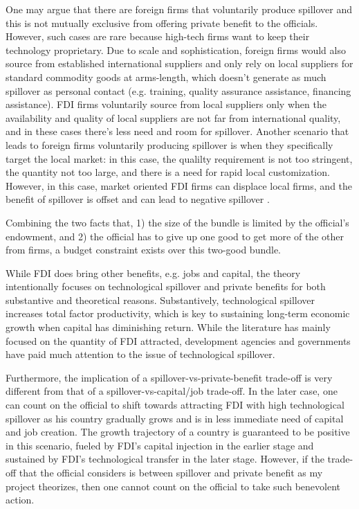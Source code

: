 One may argue that there are foreign firms that voluntarily produce spillover and this is not mutually exclusive from offering private benefit to the officials. However, such cases are rare because high-tech firms want to keep their technology proprietary. Due to scale and sophistication, foreign firms would also source from established international suppliers and only rely on local suppliers for standard commodity goods at arms-length, which doesn't generate as much spillover as personal contact (e.g. training, quality assurance assistance, financing assistance). FDI firms voluntarily source from local suppliers only when the availability and quality of local suppliers are not far from international quality, and in these cases there's less need and room for spillover. Another scenario that leads to foreign firms voluntarily producing spillover is when they specifically target the local market: in this case, the qualilty requirement is not too stringent, the quantity not too large, and there is a need for rapid local customization. However, in this case, market oriented FDI firms can displace local firms, and the benefit of spillover is offset and can lead to negative spillover \citep{Mody2004}.

Combining the two facts that, 1) the size of the bundle is limited by the official's endowment, and 2) the official has to give up one good to get more of the other from firms, a budget constraint exists over this two-good bundle.

While FDI does bring other benefits, e.g. jobs and capital, the theory intentionally focuses on technological spillover and private benefits for both substantive and theoretical reasons. Substantively, technological spillover increases total factor productivity, which is key to sustaining long-term economic growth when capital has diminishing return. While the literature has mainly focused on the quantity of FDI attracted, development agencies and governments have paid much attention to the issue of technological spillover. 

Furthermore, the implication of a spillover-vs-private-benefit trade-off is very different from that of a spillover-vs-capital/job trade-off. In the later case, one can count on the official to shift towards attracting FDI with high technological spillover as his country gradually grows and is in less immediate need of capital and job creation. The growth trajectory of a country is guaranteed to be positive in this scenario, fueled by FDI's capital injection in the earlier stage and sustained by FDI's technological transfer in the later stage. However, if the trade-off that the official considers is between spillover and private benefit as my project theorizes, then one cannot count on the official to take such benevolent action.

